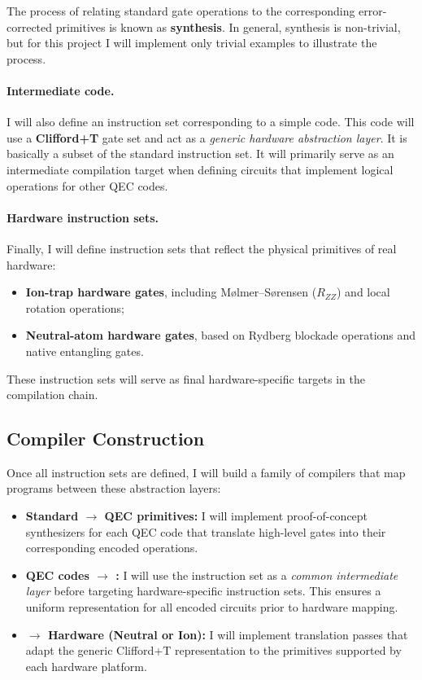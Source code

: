 The process of relating standard gate operations to the corresponding error-corrected primitives is known as \textbf{synthesis}.  
In general, synthesis is non-trivial, but for this project I will implement only trivial examples to illustrate the process.

\paragraph{Intermediate  code.}
I will also define an instruction set corresponding to a simple  code.  
This code will use a \textbf{Clifford+T} gate set and act as a \emph{generic hardware abstraction layer}.  It is basically a subset of the standard instruction set.
It will primarily serve as an intermediate compilation target when defining circuits that implement logical operations for other QEC codes.

\paragraph{Hardware instruction sets.}
Finally, I will define instruction sets that reflect the physical primitives of real hardware:
\begin{itemize}
    \item \textbf{Ion-trap hardware gates}, including Mølmer–Sørensen (\(R_{ZZ}\)) and local rotation operations;
    \item \textbf{Neutral-atom hardware gates}, based on Rydberg blockade operations and native entangling gates.
\end{itemize}
These instruction sets will serve as final hardware-specific targets in the compilation chain.

\subsection{Compiler Construction}

Once all instruction sets are defined, I will build a family of compilers that map programs between these abstraction layers:
\begin{itemize}
    \item \textbf{Standard $\rightarrow$ QEC primitives:}  
    I will implement proof-of-concept synthesizers for each QEC code that translate high-level gates into their corresponding encoded operations.
    \item \textbf{QEC codes $\rightarrow$ :}  
    I will use the  instruction set as a \emph{common intermediate layer} before targeting hardware-specific instruction sets.  
    This ensures a uniform representation for all encoded circuits prior to hardware mapping.
    \item \textbf{ $\rightarrow$ Hardware (Neutral or Ion):}  
    I will implement translation passes that adapt the generic Clifford+T representation to the primitives supported by each hardware platform.
\end{itemize}

